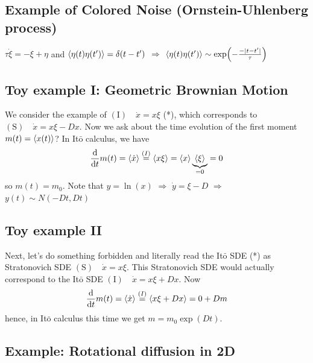 \documentclass{/home/ben/Templates/notebook}
\begin{document}
	
	\subsection*{Example of Colored Noise (Ornstein-Uhlenberg process)}
	
	$\tau \dot{\xi} = - \xi + \eta$ and $\expval{\eta(t) \eta(t')} = \delta(t-t')$ $\Rightarrow$ $\expval{\eta(t) \eta(t')} \sim \exp(- \frac{-|t-t'|}{\tau})$
	
	\subsection*{Toy example I: Geometric Brownian Motion}
	
	We consider the example of $\mathrm{(I)} \quad \dot{x} = x \xi$ (*), which corresponds to $\mathrm{(S)} \quad \dot{x} = x \xi - Dx$. Now we ask about the time evolution of the first moment $m(t) = \expval{x(t)}$? In It$\bar{\mathrm{o}}$ calculus, we have
	\begin{equation}
	\dv{t} m(t) = \expval{\dot{x}} \overset{(I)}{=} \expval{x \xi} = \expval{x} \underbrace{\expval{\xi}}_{= 0} = 0
	\end{equation}
	so $m(t) = m_0$. Note that $y = \ln(x)$ $\Rightarrow$ $\dot{y} = \xi - D$ $\Rightarrow$ $y(t) \sim N(-D t, D t)$
	
	\subsection*{Toy example II}
	
	Next, let's do something forbidden and literally read the It$\bar{\mathrm{o}}$ SDE (*) as Stratonovich SDE $\mathrm{(S)} \quad \dot{x} = x \xi$. This Stratonovich SDE would actually correspond to the It$\bar{\mathrm{o}}$ SDE $\mathrm{(I)} \quad \dot{x} = x \xi + D x$. Now
	\begin{equation}
	\dv{t} m(t) = \expval{\dot{x}} \overset{(I)}{=} \expval{x \xi + D x} = 0 + D m
	\end{equation}
	hence, in It$\bar{\mathrm{o}}$ calculus this time we get $m = m_0 \exp(Dt)$.
	
	\subsection*{Example: Rotational diffusion in 2D}
	
\end{document}

